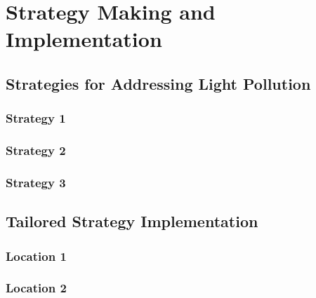 \MinParskip{}

\section{Strategy Making and Implementation}


\subsection{Strategies for Addressing Light Pollution}

\subsubsection{Strategy 1}

\subsubsection{Strategy 2}

\subsubsection{Strategy 3}


\subsection{Tailored Strategy Implementation}

\subsubsection{Location 1}

\subsubsection{Location 2}


